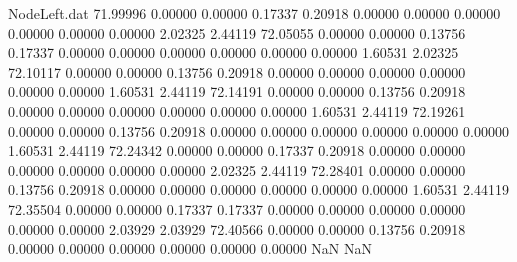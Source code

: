 \begin{filecontents}{NodeLeft.dat}
  71.99996    0.00000    0.00000     0.17337    0.20918    0.00000    0.00000    0.00000    0.00000    0.00000    0.00000    2.02325    2.44119
  72.05055    0.00000    0.00000     0.13756    0.17337    0.00000    0.00000    0.00000    0.00000    0.00000    0.00000    1.60531    2.02325
  72.10117    0.00000    0.00000     0.13756    0.20918    0.00000    0.00000    0.00000    0.00000    0.00000    0.00000    1.60531    2.44119
  72.14191    0.00000    0.00000     0.13756    0.20918    0.00000    0.00000    0.00000    0.00000    0.00000    0.00000    1.60531    2.44119
  72.19261    0.00000    0.00000     0.13756    0.20918    0.00000    0.00000    0.00000    0.00000    0.00000    0.00000    1.60531    2.44119
  72.24342    0.00000    0.00000     0.17337    0.20918    0.00000    0.00000    0.00000    0.00000    0.00000    0.00000    2.02325    2.44119
  72.28401    0.00000    0.00000     0.13756    0.20918    0.00000    0.00000    0.00000    0.00000    0.00000    0.00000    1.60531    2.44119
  72.35504    0.00000    0.00000     0.17337    0.17337    0.00000    0.00000    0.00000    0.00000    0.00000    0.00000    2.03929    2.03929
  72.40566    0.00000    0.00000     0.13756    0.20918    0.00000    0.00000    0.00000    0.00000    0.00000    0.00000        NaN        NaN
\end{filecontents}
